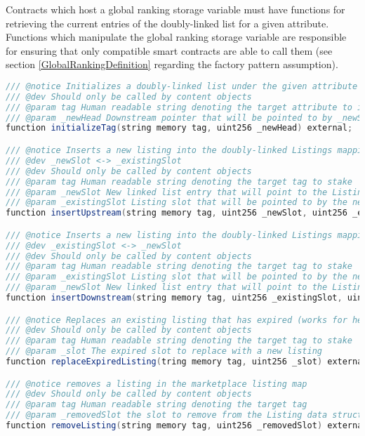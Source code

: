 Contracts which host a global ranking storage variable must have functions for retrieving the current entries of the doubly-linked list for a given attribute. Functions which manipulate the global ranking storage variable are responsible for ensuring that only compatible smart contracts are able to call them (see section \ref{GlobalRankingDefinition} regarding the factory pattern assumption).

\begin{lstlisting}[language=Java, caption=a minimal interface for reading and writing to the global ranking namespace]
/// @notice Initializes a doubly-linked list under the given attribute
/// @dev Should only be called by content objects
/// @param tag Human readable string denoting the target attribute to insert into global ranking
/// @param _newHead Downstream pointer that will be pointed to by _newSlot
function initializeTag(string memory tag, uint256 _newHead) external;

/// @notice Inserts a new listing into the doubly-linked Listings mapping
/// @dev _newSlot <-> _existingSlot 
/// @dev Should only be called by content objects
/// @param tag Human readable string denoting the target tag to stake
/// @param _newSlot New linked list entry that will point to the Listing at _existingSlot 
/// @param _existingSlot Listing slot that will be pointed to by the new Listing at _newSlot 
function insertUpstream(string memory tag, uint256 _newSlot, uint256 _existingSlot) external;

/// @notice Inserts a new listing into the doubly-linked Listings mapping
/// @dev _existingSlot <-> _newSlot
/// @dev Should only be called by content objects
/// @param tag Human readable string denoting the target tag to stake
/// @param _existingSlot Listing slot that will be pointed to by the new Listing at _newSlot  
/// @param _newSlot New linked list entry that will point to the Listing at _existingSlot 
function insertDownstream(string memory tag, uint256 _existingSlot, uint256 _newSlot) external;

/// @notice Replaces an existing listing that has expired (works for head and tail listings)
/// @dev Should only be called by content objects
/// @param tag Human readable string denoting the target tag to stake
/// @param _slot The expired slot to replace with a new listing
function replaceExpiredListing(tring memory tag, uint256 _slot) external;

/// @notice removes a listing in the marketplace listing map
/// @dev Should only be called by content objects
/// @param tag Human readable string denoting the target tag
/// @param _removedSlot the slot to remove from the Listing data structure
function removeListing(string memory tag, uint256 _removedSlot) external;


\end{lstlisting}
